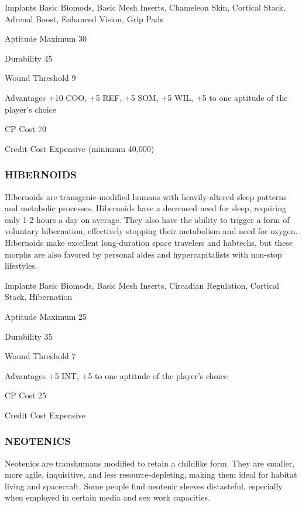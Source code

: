 \begin{description*}
\item[Implants] Basic Biomods, Basic Mesh Inserts, Chameleon Skin, Cortical
  Stack, Adrenal Boost, Enhanced Vision, Grip Pads
\item[Aptitude Maximum] 30 
\item[Durability] 45 
\item[Wound Threshold] 9 
\item[Advantages] +10 COO, +5 REF, +5 SOM, +5 WIL, +5 to one aptitude of the
  player’s choice
\item[CP Cost] 70 
\item[Credit Cost] Expensive (minimum 40,000) 
\end{description*}

\subsubsection{HIBERNOIDS}
Hibernoids are transgenic-modified humans with heavily-altered sleep patterns
and metabolic processes.  Hibernoids have a decreased need for sleep, requiring
only 1-2 hours a day on average. They also have the ability to trigger a form
of voluntary hibernation, effectively stopping their metabolism and need for
oxygen. Hibernoids make excellent long-duration space travelers and habtechs,
but these morphs are also favored by personal aides and hypercapitalists with
non-stop lifestyles.

\begin{description*}
\item[Implants] Basic Biomods, Basic Mesh Inserts, Circadian Regulation,
  Cortical Stack, Hibernation
\item[Aptitude Maximum] 25 
\item[Durability] 35 
\item[Wound Threshold] 7 
\item[Advantages] +5 INT, +5 to one aptitude of the player’s choice
\item[CP Cost] 25 
\item[Credit Cost] Expensive 
\end{description*}

\subsubsection{NEOTENICS}
Neotenics are transhumans modified to retain a childlike form. They are
smaller, more agile, inquisitive, and less resource-depleting, making them
ideal for habitat living and spacecraft. Some people find neotenic sleeves
distasteful, especially when employed in certain media and sex work capacities.

